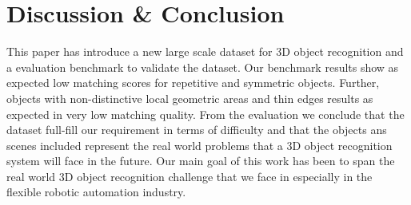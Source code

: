 \documentclass[10pt,twocolumn,letterpaper]{article}
\begin{document}
\section{Discussion \& Conclusion}\label{sec:conclusion}
This paper has introduce a new large scale dataset for 3D object recognition and a evaluation benchmark to validate the dataset. Our benchmark results show as expected low matching scores for repetitive and symmetric objects. Further, objects with non-distinctive local geometric areas and thin edges results as expected in very low matching quality. From the evaluation we conclude that the dataset full-fill our requirement in terms of difficulty and that the objects ans scenes included represent the real world problems that a 3D object recognition system will face in the future. Our main goal of this work has been to span the real world 3D object recognition challenge that we face in especially in the flexible robotic automation industry.\\
\end{document}

